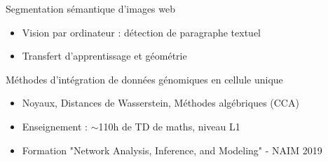 \documentclass[10pt,a4paper]{CV/fonteCV}
\begin{document}




\begin{fullwidth}
\makecvheader
\end{fullwidth}





Segmentation sémantique d'images web
\smallskip
\begin{itemize}
\item Vision par ordinateur : détection de paragraphe textuel 
\item Transfert d'apprentissage et géométrie
\end{itemize}

\divider


Méthodes d'intégration de données génomiques en cellule unique
\smallskip
\begin{itemize}
\item Noyaux, Distances de Wasserstein, Méthodes algébriques (CCA)
\item Enseignement : $\sim$110h de TD de maths, niveau L1
\item  Formation "Network Analysis, Inference, and Modeling" - NAIM 2019
\end{itemize}
\end{document}
